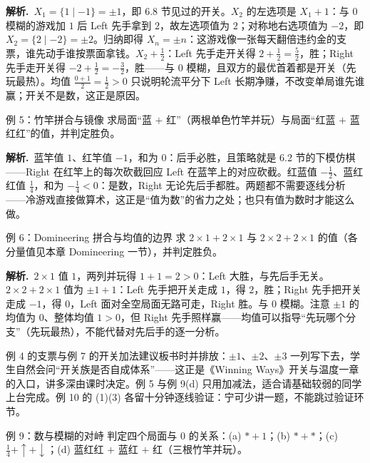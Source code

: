 \documentclass[UTF8,a4paper,11pt,oneside,openany,fontset=fandol]{ctexbook}
\theoremstyle{definition}
\newcommand{\sol}{\par\noindent\textbf{解析.}\ }
\begin{document}
\sol $X_1=\{1\mid -1\}=\pm1$，即 6.8 节见过的开关。$X_2$ 的左选项是 $X_1+1$：与 $0$ 模糊的游戏加 $1$ 后 Left 先手拿到 $2$，故左选项值为 $2$；对称地右选项值为 $-2$，即 $X_2=\{2\mid -2\}=\pm2$。归纳即得 $X_n=\pm n$：这游戏像一张每天翻倍违约金的支票，谁先动手谁按票面拿钱。$X_2+\tfrac12$：Left 先手走开关得 $2+\tfrac12=\tfrac52$，胜；Right 先手走开关得 $-2+\tfrac12=-\tfrac32$，胜——与 $0$ 模糊，且双方的最优首着都是开关（先玩最热）。均值 $\tfrac{0+1}{2}=\tfrac12>0$ 只说明轮流平分下 Left 长期净赚，不改变单局谁先谁赢；开关不是数，这正是原因。

\begin{problem}{例 5：竹竿拼合与镜像}
求局面“蓝 $+$ 红”（两根单色竹竿并玩）与局面“红蓝 $+$ 蓝红红”的值，并判定胜负。
\end{problem}

\sol 蓝竿值 $1$、红竿值 $-1$，和为 $0$：后手必胜，且策略就是 6.2 节的下模仿棋——Right 在红竿上的每次砍截回应 Left 在蓝竿上的对应砍截。红蓝值 $-\tfrac12$、蓝红红值 $\tfrac14$，和为 $-\tfrac14<0$：是数，Right 无论先后手都胜。两题都不需要逐线分析——冷游戏直接做算术，这正是“值为数”的省力之处；也只有值为数时才能这么做。

\begin{problem}{例 6：Domineering 拼合与均值的边界}
求 $2\times1+2\times1$ 与 $2\times2+2\times1$ 的值（各分量值见本章 Domineering 一节），并判定胜负。
\end{problem}

\sol $2\times1$ 值 $1$，两列并玩得 $1+1=2>0$：Left 大胜，与先后手无关。$2\times2+2\times1$ 值为 $\pm1+1$：Left 先手把开关走成 $1$，得 $2$，胜；Right 先手把开关走成 $-1$，得 $0$，Left 面对全空局面无路可走，Right 胜。与 $0$ 模糊。注意 $\pm1$ 的均值为 $0$、整体均值 $1>0$，但 Right 先手照样赢——均值可以指导“先玩哪个分支”（先玩最热），不能代替对先后手的逐一分析。

\begin{teach}[ch6 例题节讲评建议]
例 4 的支票与例 7 的开关加法建议板书时并排放：$\pm1$、$\pm2$、$\pm3$ 一列写下去，学生自然会问“开关族是否自成体系”——这正是《Winning Ways》开关与温度一章的入口，讲多深由课时决定。例 5 与例 9(d) 只用加减法，适合请基础较弱的同学上台完成。例 10 的 (1)(3) 各留十分钟逐线验证：宁可少讲一题，不能跳过验证环节。
\end{teach}

\begin{problem}{例 9：数与模糊的对峙}
判定四个局面与 $0$ 的关系：(a) $\ast+1$；(b) $\ast+\ast$；(c) $\tfrac14+\uparrow+\downarrow$；(d) 蓝红红 $+$ 蓝红 $+$ 红（三根竹竿并玩）。
\end{problem}
\end{document}
